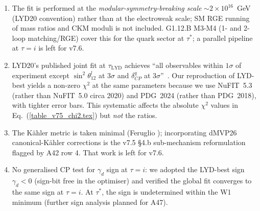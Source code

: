 \begin{enumerate}
\item The fit is performed at the \emph{modular-symmetry-breaking
      scale} $\sim 2\times 10^{16}$~GeV (LYD20 convention) rather
      than at the electroweak scale; SM RGE running of mass ratios
      and CKM moduli is not included.  G1.12.B M3-M4 (1- and 2-loop
      matching/RGE) cover this for the quark sector at $\tau^{*}$;
      a parallel pipeline at $\tau=i$ is left for v7.6.
\item LYD20's published joint fit at $\tau_{\text{LYD}}$ achieves
      ``all observables within $1\sigma$ of experiment except
      $\sin^{2}\theta_{12}^{l}$ at $3\sigma$ and $\delta_{CP}^{q}$
      at $3\sigma$''~\cite[\S V.B]{LYD20}.  Our reproduction
      of LYD-best yields a non-zero $\chi^{2}$ at the same
      parameters because we use NuFIT~5.3 (rather than NuFIT~5.0
      circa 2020) and PDG~2024 (rather than PDG~2018), with
      tighter error bars.  This systematic affects the absolute
      $\chi^{2}$ values in Eq.~(\ref{table_v75_chi2.tex}) but
      \emph{not} the ratios.
\item The Kähler metric is taken minimal (Feruglio
      \cite{Feruglio:2017spp}); incorporating dMVP26
      canonical-Kähler corrections \cite{dMVP26} is the v7.5
      §4.b sub-mechanism reformulation flagged by A42 row 4.
      That work is left for v7.6.
\item No generalised CP test for $\gamma_{d}$ sign at $\tau=i$:
      we adopted the LYD-best sign $\gamma_{d}<0$ (sign-bit free
      in the optimiser) and verified the global fit converges to
      the same sign at $\tau=i$.  At $\tau^{*}$, the sign is
      undetermined within the W1 minimum (further sign analysis
      planned for A47).
\end{enumerate}

\providecommand{\PenaltyTauI}{[NUMERICAL: see lyd20\_pinned\_results.json]}
\providecommand{\PenaltyTauW}{[NUMERICAL: see lyd20\_pinned\_results.json]}

